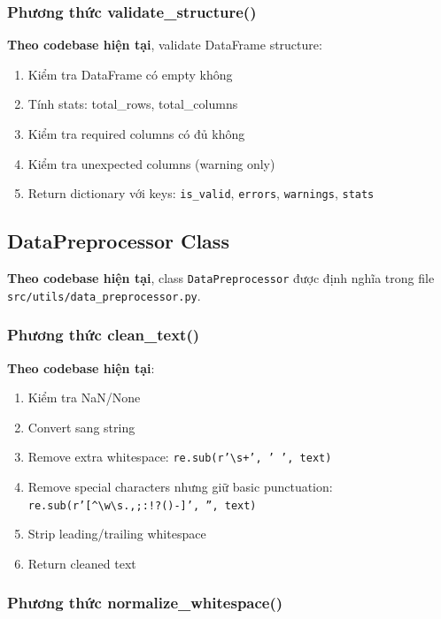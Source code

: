 \subsubsection{Phương thức validate\_structure()}

\textbf{Theo codebase hiện tại}, validate DataFrame structure:
\begin{enumerate}
    \item Kiểm tra DataFrame có empty không
    \item Tính stats: total\_rows, total\_columns
    \item Kiểm tra required columns có đủ không
    \item Kiểm tra unexpected columns (warning only)
    \item Return dictionary với keys: \texttt{is\_valid}, \texttt{errors}, \texttt{warnings}, \texttt{stats}
\end{enumerate}

\subsection{DataPreprocessor Class}

\textbf{Theo codebase hiện tại}, class \texttt{DataPreprocessor} được định nghĩa trong file \texttt{src/utils/data\_preprocessor.py}.

\subsubsection{Phương thức clean\_text()}

\textbf{Theo codebase hiện tại}:
\begin{enumerate}
    \item Kiểm tra NaN/None
    \item Convert sang string
    \item Remove extra whitespace: \texttt{re.sub(r'\textbackslash s+', ' ', text)}
    \item Remove special characters nhưng giữ basic punctuation: \texttt{re.sub(r'[\textasciicircum \textbackslash w\textbackslash s.,;:!?()-]', '', text)}
    \item Strip leading/trailing whitespace
    \item Return cleaned text
\end{enumerate}

\subsubsection{Phương thức normalize\_whitespace()}

